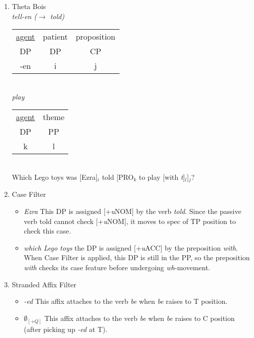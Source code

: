 \documentclass[a4paper, 11pt]{article}
\begin{document}
\begin{enumerate}[label=\textbf{\arabic*.}]
\begin{enumerate}[label=(\alph*)]
\begin{enumerate}[label=\roman*.]
    \item Theta Bois\\
    \emph{tell-en ($\rightarrow$ told)}\\
    \begin{tabular}{ |c|c|c| } 
        \hline
        \underline{agent} & patient & proposition \\ 
        DP & DP & CP  \\ 
        \hline
        -en & i & j \\ 
        \hline
    \end{tabular}
    \vspace{5mm}\\
    \emph{play}\\
    \begin{tabular}{ |c|c| } 
        \hline
        \underline{agent} & theme \\ 
        DP & PP  \\ 
        \hline
        k & l \\ 
        \hline
    \end{tabular}
    \vspace{5mm}\\
    Which Lego toys was [Ezra]$_{i}$ told [PRO$_{k}$ to play [with \emph{t}]$_{l}$]$_{j}$?

    \item Case Filter
    \begin{itemize}
        \item \emph{Ezra} This DP is assigned [+\emph{u}NOM] by the verb \emph{told}. Since the
        passive verb told cannot check [+\emph{u}NOM], it moves to spec of TP position to check
        this case.
        \item \emph{which Lego toys} the DP is assigned [+\emph{u}ACC] by the preposition
        \emph{with}. When Case Filter is applied, this DP is still in the PP, so the preposition
        \emph{with} checks its case feature before undergoing \emph{wh}-movement.
    \end{itemize}

    \item Stranded Affix Filter
    \begin{itemize}
        \item \emph{-ed} This affix attaches to the verb \emph{be} when \emph{be} raises to T position.
        \item \emph{$\emptyset_{[+Q]}$} This affix attaches to the verb \emph{be} when \emph{be} raises
        to C position (after picking up \emph{-ed} at T).
    \end{itemize} 


\end{enumerate}
\end{enumerate}
\end{enumerate}
\end{document}
